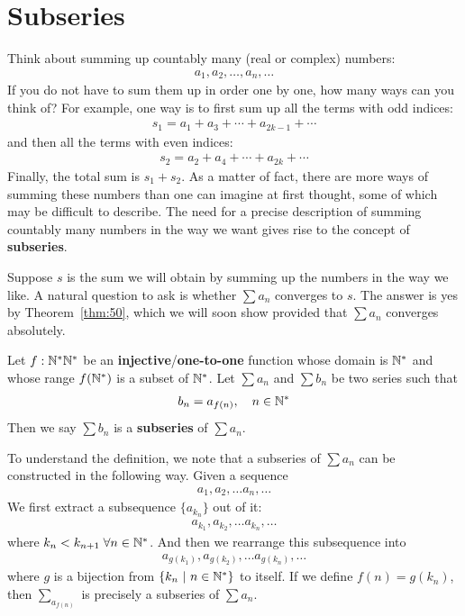 \documentclass[thmcnt=section, 12pt]{my-elegantbook}
\begin{document}

\section{Subseries}

Think about summing up countably many (real or complex) numbers:
\begin{align*}
    a_1, a_2, \ldots, a_n, \ldots
\end{align*}
If you do not have to sum them up in order one by one, how many ways can you think of? For example, one way is to first sum up all the terms with odd indices:
\begin{align*}
    s_1 = a_1 + a_3 + \cdots + a_{2k-1} + \cdots
\end{align*}
and then all the terms with even indices:
\begin{align*}
    s_2 = a_2 + a_4 + \cdots + a_{2k} + \cdots
\end{align*}
Finally, the total sum is $s_1 + s_2$. As a matter of fact, there are more ways of summing these numbers than one can imagine at first thought, some of which may be difficult to describe. The need for a precise description of summing countably many numbers in the way we want gives rise to the concept of \textbf{subseries}.

Suppose $s$ is the sum we will obtain by summing up the numbers in the way we like. A natural question to ask is whether $\sum a_n$ converges to $s$. The answer is yes by Theorem~\ref{thm:50}, which we will soon show provided that $\sum a_n$ converges absolutely.


\begin{definition}
    Let $f: \mathbb{N}^\ast \mathbb{N}^\ast$ be an \textbf{injective}/\textbf{one-to-one} function whose domain is $\mathbb{N}^\ast$ and whose range $f(\mathbb{N}^\ast)$ is a subset of $\mathbb{N}^\ast$. Let $\sum a_n$ and $\sum b_n$ be two series such that 
    \begin{align*}
        b_n = a_{f(n)}, 
        \quad n \in \mathbb{N}^\ast
    \end{align*}
    Then we say $\sum b_n$ is a \textbf{subseries} of $\sum a_n$.
\end{definition}

To understand the definition, we note that a subseries of $\sum a_n$ can be constructed in the following way. Given a sequence
\begin{align*}
    a_1, a_2, \ldots a_n, \ldots
\end{align*}
We first extract a subsequence $\{a_{k_n}\}$ out of it:
\begin{align*}
    a_{k_1}, a_{k_2}, \ldots a_{k_n}, \ldots
\end{align*}
where $k_{n} < k_{n+1} \; \forall n \in \mathbb{N}^\ast$. And then we rearrange this subsequence into 
\begin{align*}
    a_{g(k_1)}, a_{g(k_2)}, \ldots a_{g(k_n)}, \ldots
\end{align*}
where $g$ is a bijection from $\left\{ k_n \ \middle| \ n \in \mathbb{N}^\ast \right\}$ to itself. If we define $f(n) = g(k_n)$, then $\sum_{a_{f(n)}}$ is precisely a subseries of $\sum a_n$.
\end{document}
